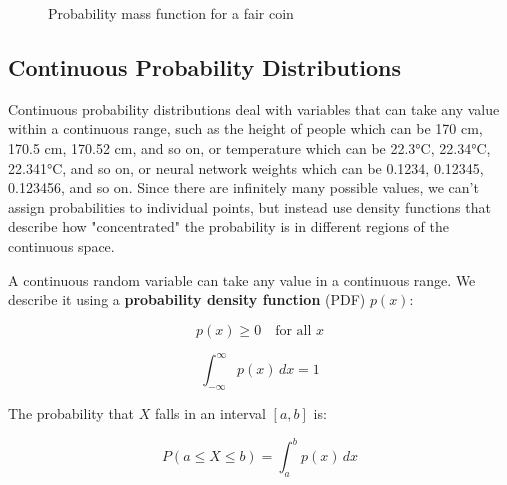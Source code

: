 \begin{figure}[h]
\centering
{}
\caption{Probability mass function for a fair coin}
\label{fig:coin-pmf}
\end{figure}

\subsection{Continuous Probability Distributions}

Continuous probability distributions deal with variables that can take any value within a continuous range, such as the height of people which can be 170 cm, 170.5 cm, 170.52 cm, and so on, or temperature which can be 22.3°C, 22.34°C, 22.341°C, and so on, or neural network weights which can be 0.1234, 0.12345, 0.123456, and so on. Since there are infinitely many possible values, we can't assign probabilities to individual points, but instead use density functions that describe how "concentrated" the probability is in different regions of the continuous space.

A continuous random variable can take any value in a continuous range. We describe it using a \textbf{probability density function} (PDF) $p(x)$:

\begin{equation}
p(x) \geq 0 \quad \text{for all } x
\end{equation}

\begin{equation}
\int_{-\infty}^{\infty} p(x) \, dx = 1
\end{equation}

The probability that $X$ falls in an interval $[a, b]$ is:

\begin{equation}
P(a \leq X \leq b) = \int_a^b p(x) \, dx
\end{equation}

